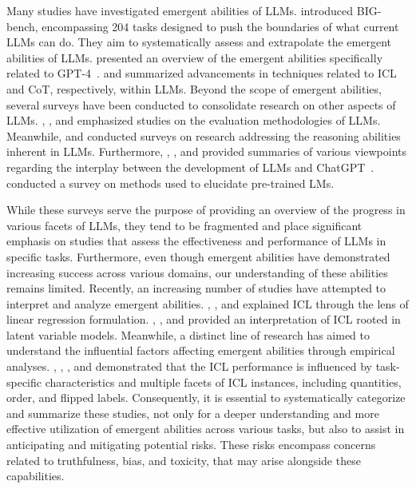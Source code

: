 \documentclass[11pt,a4paper]{article}
\begin{document}
Many studies have investigated emergent abilities of LLMs. %
\citet{Srivastava2022BeyondTI} introduced BIG-bench, encompassing 204 tasks designed to push the boundaries of what current LLMs can do. %
They aim to systematically assess and extrapolate the emergent abilities of LLMs.
\citet{Bubeck2023SparksOA} presented an overview of the emergent abilities specifically related to GPT-4~\cite{OpenAI2023GPT4TR}.
\citet{Dong2022ASO} and \citet{Chu2023ASO} summarized advancements in techniques related to ICL and CoT, respectively, within LLMs.
Beyond the scope of emergent abilities, several surveys have been conducted to consolidate research on other aspects of LLMs.
\citet{Liang2022HolisticEO}, \citet{Chang2023ASO}, and \citet{Srivastava2022BeyondTI} emphasized studies on the evaluation methodologies of LLMs.
Meanwhile, \citet{Huang2022TowardsRI} and \citet{Qiao2022ReasoningWL} conducted surveys on research addressing the reasoning abilities inherent in LLMs.
Furthermore, \citet{Cao2023ACS}, \citet{Zhou2023ACS}, and \citet{Yang2023HarnessingTP} provided summaries of various viewpoints regarding the interplay between the development of LLMs and ChatGPT~\cite{Ouyang2022TrainingLM}. 
\citet{Zhao2023ExplainabilityFL} conducted a survey on methods used to elucidate pre-trained LMs.

While these surveys serve the purpose of providing an overview of the progress in various facets of LLMs, they tend to be fragmented and place significant emphasis on studies that assess the effectiveness and performance of LLMs in specific tasks.
Furthermore, even though emergent abilities have demonstrated increasing success across various domains, our understanding of these abilities remains limited.
Recently, an increasing number of studies have attempted to interpret and analyze emergent abilities.
\citet{Garg2022WhatCT}, \citet{Dai2023WhyCG}, and \citet{Akyrek2023WHL} explained ICL through the lens of linear regression formulation.
\citet{Xie2021AnEO}, \citet{Wang2023LargeLM}, and \citet{Hahn2023ATO} provided an interpretation of ICL rooted in latent variable models.
Meanwhile, a distinct line of research has aimed to understand the influential factors affecting emergent abilities through empirical analyses.
\citet{Min2022RethinkingTR}, \citet{Wei2023LargerLM}, \citet{Wang2023LabelWA}, and \citet{Kim2022GroundTruthLM} demonstrated that the ICL performance is influenced by task-specific characteristics and multiple facets of ICL instances, including quantities, order, and flipped labels. %
Consequently, it is essential to systematically categorize and summarize these studies, not only for a deeper understanding and more effective utilization of emergent abilities across various tasks, but also to assist in anticipating and mitigating potential risks. These risks encompass concerns related to truthfulness, bias, and toxicity, that may arise alongside these capabilities.
\end{document}
